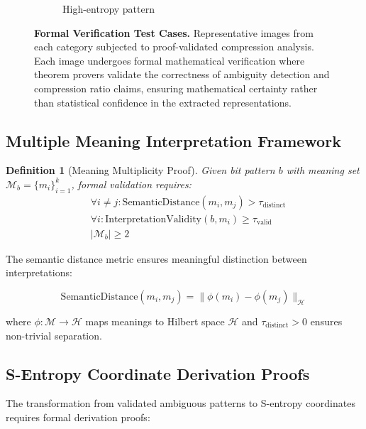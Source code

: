 \documentclass[11pt,a4paper]{article}
\newtheorem{definition}[theorem]{Definition}
\begin{document}
\begin{figure}[htbp]
\begin{subfigure}{0.45\textwidth}
    \caption{High-entropy pattern}
    \end{subfigure}
    \caption{\textbf{Formal Verification Test Cases.} Representative images from each category subjected to proof-validated compression analysis. Each image undergoes formal mathematical verification where theorem provers validate the correctness of ambiguity detection and compression ratio claims, ensuring mathematical certainty rather than statistical confidence in the extracted representations.}
    \label{fig:proof-validation-cases}
    \end{figure}

\subsection{Multiple Meaning Interpretation Framework}

\begin{definition}[Meaning Multiplicity Proof]
Given bit pattern $b$ with meaning set $\mathcal{M}_b = \{m_i\}_{i=1}^k$, formal validation requires:
\begin{align}
&\forall i \neq j: \text{SemanticDistance}(m_i, m_j) > \tau_{\text{distinct}} \label{eq:meaning-separation}\\
&\forall i: \text{InterpretationValidity}(b, m_i) \geq \tau_{\text{valid}} \label{eq:interpretation-validity}\\
&|\mathcal{M}_b| \geq 2 \label{eq:minimum-meanings}
\end{align}
\end{definition}

The semantic distance metric ensures meaningful distinction between interpretations:

\begin{equation}
\text{SemanticDistance}(m_i, m_j) = \|\phi(m_i) - \phi(m_j)\|_{\mathcal{H}}
\label{eq:semantic-distance}
\end{equation}

where $\phi: \mathcal{M} \to \mathcal{H}$ maps meanings to Hilbert space $\mathcal{H}$ and $\tau_{\text{distinct}} > 0$ ensures non-trivial separation.

\subsection{S-Entropy Coordinate Derivation Proofs}

The transformation from validated ambiguous patterns to S-entropy coordinates requires formal derivation proofs:
\end{document}
